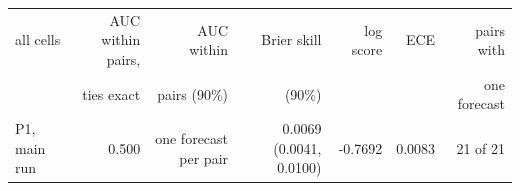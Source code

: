 \begin{tabular}{lrrrrrr}
\toprule
all cells & AUC within pairs, & AUC within & Brier skill & log score & ECE & pairs with \\
 & ties exact & pairs (90\%) & (90\%) & & & one forecast \\
\midrule
P1, main run & 0.500 & one forecast per pair & 0.0069 (0.0041, 0.0100) & -0.7692 & 0.0083 & 21 of 21 \\

\end{tabular}
